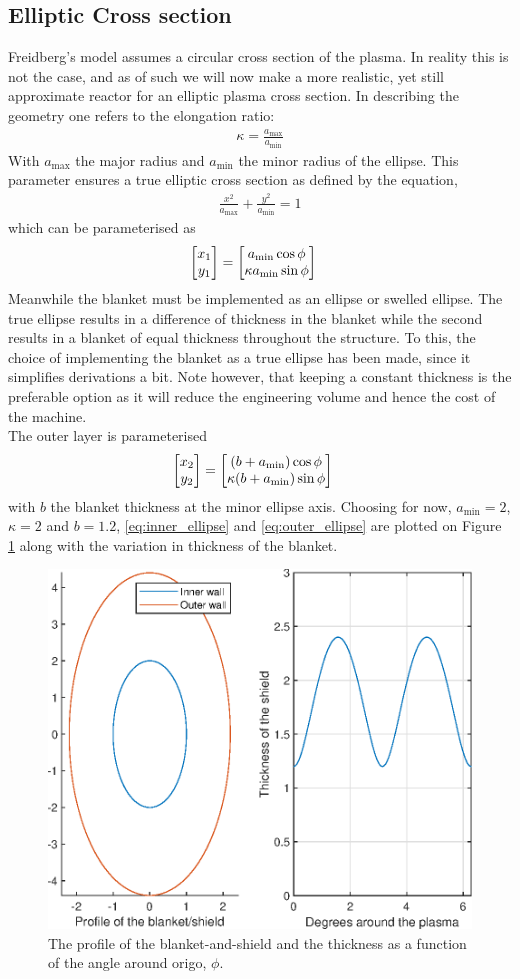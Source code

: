 \subsection{Elliptic Cross section}
Freidberg's model assumes a circular cross section of the plasma. In reality this is not the case, and as of such we will now make a more realistic, yet still approximate reactor for an elliptic plasma cross section.
In describing the geometry one refers to the elongation ratio:
\begin{align}
	\kappa = \frac{a_{\max}}{a_{\min}}
\end{align}
With $a_{\max}$ the major radius and $a_{\min}$ the minor radius of the ellipse. This parameter ensures a true elliptic cross section as defined by the equation,
\begin{align}
	\frac{x^2}{a_{\max}}+\frac{y^2}{a_{\min}} = 1
\end{align}
which can be parameterised as
\begin{align}
	\mqty[x_1 \\y_1] &= \mqty[a_{\min}\cos{\phi}\\\kappa a_{\min}\sin{\phi}]
	\label{eq:inner_ellipse}
\end{align}
Meanwhile the blanket must be implemented as an ellipse or swelled ellipse. The true ellipse results in a difference of thickness in the blanket while the second results in a blanket of equal thickness throughout the structure. To this, the choice of implementing the blanket as a true ellipse has been made, since it simplifies derivations a bit. Note however, that keeping a constant thickness is the preferable option as it will reduce the engineering volume and hence the cost of the machine.\\
The outer layer is parameterised
\begin{align}
	\mqty[x_2 \\y_2] &= \mqty[\pqty{b+a_{\min}}\cos{\phi}\\\kappa \pqty{b+a_{\min}}\sin{\phi}]
	\label{eq:outer_ellipse}
\end{align}
with $b$ the blanket thickness at the minor ellipse axis. Choosing for now, $a_{\min}=2$, $\kappa=2$ and $b=1.2$, \ref{eq:inner_ellipse} and \ref{eq:outer_ellipse} are plotted on Figure \ref{ShTh} along with the variation in thickness of the blanket.
\begin{figure}
	\vspace{-5mm}
	\includegraphics[width=.4\textwidth]{MatlabFigures/ShieldThickness/ShieldThickness.eps}
	\caption{The profile of the blanket-and-shield and the thickness as a function of the angle around origo, \(\phi\).}
	\label{ShTh}
\end{figure}
